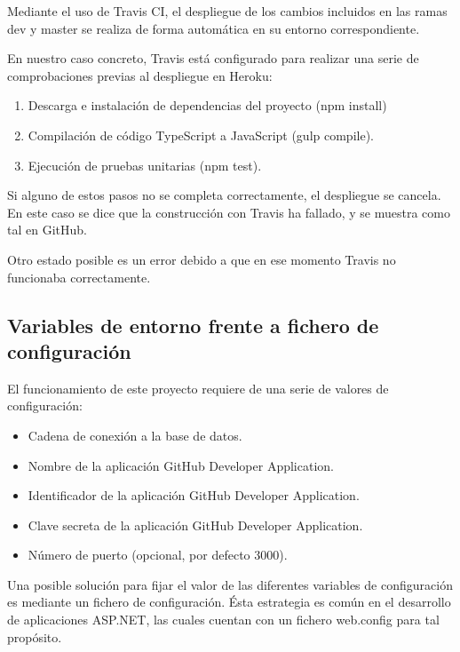 Mediante el uso de Travis CI, el despliegue de los cambios incluidos en las ramas dev y master se realiza de forma automática en su entorno correspondiente.


En nuestro caso concreto, Travis está configurado para realizar una serie de comprobaciones previas al despliegue en Heroku:

\begin{enumerate}
	\item Descarga e instalación de dependencias del proyecto (npm install)
	\item Compilación de código TypeScript a JavaScript (gulp compile).
	\item Ejecución de pruebas unitarias (npm test).
\end{enumerate}

Si alguno de estos pasos no se completa correctamente, el despliegue se cancela. En este caso se dice que la construcción con Travis ha fallado, y se muestra como tal en GitHub.

Otro estado posible es un error debido a que en ese momento Travis no funcionaba correctamente.


\subsection{Variables de entorno frente a fichero de configuración}

El funcionamiento de este proyecto requiere de una serie de valores de configuración:

\begin{itemize}
	\item Cadena de conexión a la base de datos.
	\item Nombre de la aplicación GitHub Developer Application.
	\item Identificador de la aplicación GitHub Developer Application.
	\item Clave secreta de la aplicación GitHub Developer Application.
	\item Número de puerto (opcional, por defecto 3000).
\end{itemize}

Una posible solución para fijar el valor de las diferentes variables de configuración es mediante un fichero de configuración. Ésta estrategia es común en el desarrollo de aplicaciones ASP.NET, las cuales cuentan con un fichero web.config para tal propósito.

